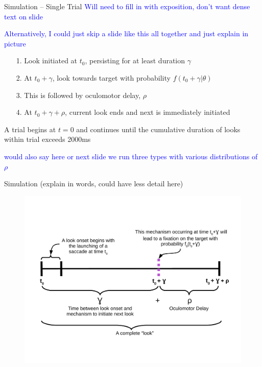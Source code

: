 \documentclass{beamer}
\providecommand{\cn}[1]{\textcolor{blue}{#1}}
\begin{document}
\begin{frame}{Simulation -- Single Trial}\large
\cn{Will need to fill in with exposition, don't want dense text on slide}

\cn{Alternatively, I could just skip a slide like this all together and just explain in picture}

\begin{enumerate}
\item[1.] Look initiated at $t_0$, persisting for at least duration $\gamma$
\item[2.] At $t_0 + \gamma$, look towards target with probability $f(t_0 + \gamma|\theta)$
\item[3.] This is followed by oculomotor delay, $\rho$
\item[4.] At $t_0 + \gamma + \rho$, current look ends and next is immediately initiated
\end{enumerate}

\vspace{5mm}

A trial begins at $t = 0$ and continues until the cumulative duration of looks within trial exceeds 2000ms

\cn{would also say here or next slide we run three types with various distributions of $\rho$}

\end{frame}

\begin{frame}{Simulation (explain in words, could have less detail here)}

\vspace{-2.5mm}
\begin{figure}
\centering
\includegraphics[scale=0.4]{look_comp.pdf}
\end{figure}
\end{frame}
\end{document}
